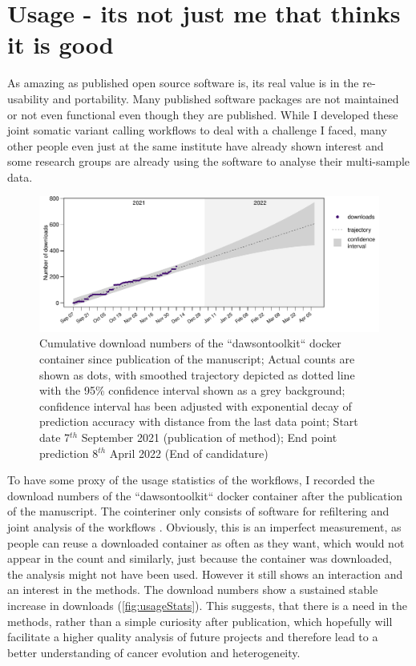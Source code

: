 \section[Usage]{Usage - its not just me that thinks it is good}
\label{variantcalling-sec:usage}
As amazing as published open source software is, its real value is in the re-usability and portability. Many published software packages are not maintained or not even functional even though they are published. While I developed these joint somatic variant calling workflows to deal with a challenge I faced, many other people even just at the same institute have already shown interest and some research groups are already using the software to analyse their multi-sample data.

\begin{figure}[!ht]
\centering
\includegraphics[width=.99\linewidth]{Figures/dawsontoolkitDownloads.pdf}
\caption[Usage statistics joint workflows]{Cumulative download numbers of the ``dawsontoolkit`` docker container since publication of the manuscript; Actual counts are shown as dots, with smoothed trajectory depicted as dotted line with the 95\% confidence interval shown as a grey background; confidence interval has been adjusted with exponential decay of prediction accuracy with distance from the last data point; Start date 7$^{th}$ September 2021 (publication of method); End point prediction 8$^{th}$ April 2022 (End of candidature)}\label{fig:usageStats}
\end{figure}

To have some proxy of the usage statistics of the workflows, I recorded the download numbers of the ``dawsontoolkit`` docker container after the publication of the manuscript. The cointeriner only consists of software for refiltering and joint analysis of the workflows . Obviously, this is an imperfect measurement, as people can reuse a downloaded container as often as they want, which would not appear in the count and similarly, just because the container was downloaded, the analysis might not have been used. However it still shows  an interaction and an interest in the methods. The download numbers show a sustained stable increase in downloads (\autoref{fig:usageStats}). This suggests, that there is a need in the methods, rather than a simple curiosity after publication, which hopefully will facilitate a higher quality analysis of future projects and therefore lead to a better understanding of cancer evolution and heterogeneity.
